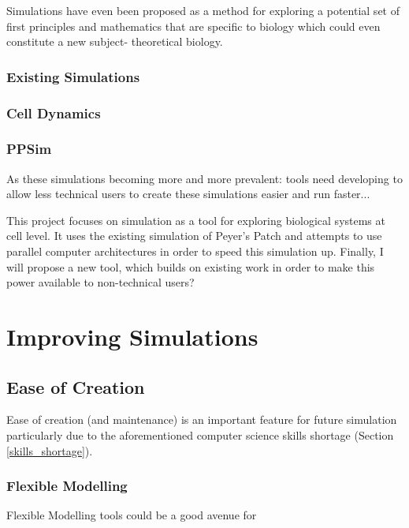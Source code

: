 \documentclass{UoYCSproject}
\begin{document}
Simulations have even been proposed as a method for exploring a potential set of first principles and mathematics that are specific to biology which could even constitute a new subject- theoretical biology\cite{rise_article}.

\subsection{Existing Simulations}

\subsection{Cell Dynamics}

\subsection{PPSim}
As these simulations becoming more and more prevalent: tools need developing to allow less technical users to create these simulations easier and run faster...


This project focuses on simulation as a tool for exploring biological systems at cell level. It uses the existing simulation of Peyer's Patch\cite{kieran_thesis} and attempts to use parallel computer architectures in order to speed this simulation up. Finally, I will propose a new tool, which builds on existing work in order to make this power available to non-technical users?

\chapter{Improving Simulations}
\section{Ease of Creation}
Ease of creation (and maintenance) is an important feature for future simulation particularly due to the aforementioned computer science skills shortage (Section \ref{skills_shortage}).

\subsection{Flexible Modelling}
Flexible Modelling tools could be a good avenue for \cite{Paige2017}
\end{document}
